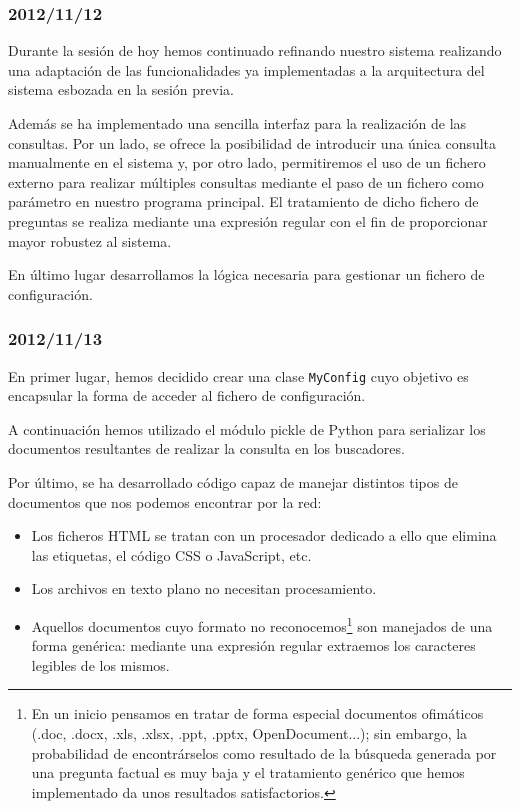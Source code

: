 \documentclass[12pt,a4paper,titlepage]{article}
\begin{document}
\subsubsection*{2012/11/12}
Durante la sesión de hoy hemos continuado refinando nuestro sistema realizando una adaptación de las funcionalidades ya implementadas a la arquitectura del sistema esbozada en la sesión previa.

Además se ha implementado una sencilla interfaz para la realización de las consultas. Por un lado, se ofrece la posibilidad de introducir una única consulta manualmente en el sistema y, por otro lado, permitiremos el uso de un fichero externo para realizar múltiples consultas mediante el paso de un fichero como parámetro en nuestro programa principal. El tratamiento de dicho fichero de preguntas se realiza mediante una expresión regular con el fin de proporcionar mayor robustez al sistema.

En último lugar desarrollamos la lógica necesaria para gestionar un fichero de configuración.

\subsubsection*{2012/11/13}
En primer lugar, hemos decidido crear una clase \texttt{MyConfig} cuyo objetivo es encapsular la forma de acceder al fichero de configuración.

A continuación hemos utilizado el módulo pickle de Python para serializar los documentos resultantes de realizar la consulta en los buscadores.

Por último, se ha desarrollado código capaz de manejar distintos tipos de documentos que nos podemos encontrar por la red:
\begin{itemize}
\item Los ficheros HTML se tratan con un procesador dedicado a ello que elimina las etiquetas, el código CSS o JavaScript, etc.
\item Los archivos en texto plano no necesitan procesamiento.
\item Aquellos documentos cuyo formato no reconocemos\footnote{En un inicio pensamos en tratar de forma especial documentos ofimáticos (.doc, .docx, .xls, .xlsx, .ppt, .pptx, OpenDocument...); sin embargo, la probabilidad de encontrárselos como resultado de la búsqueda generada por una pregunta factual es muy baja y el tratamiento genérico que hemos implementado da unos resultados satisfactorios.} son manejados de una forma genérica: mediante una expresión regular extraemos los caracteres legibles de los mismos.
\end{itemize}
\end{document}
